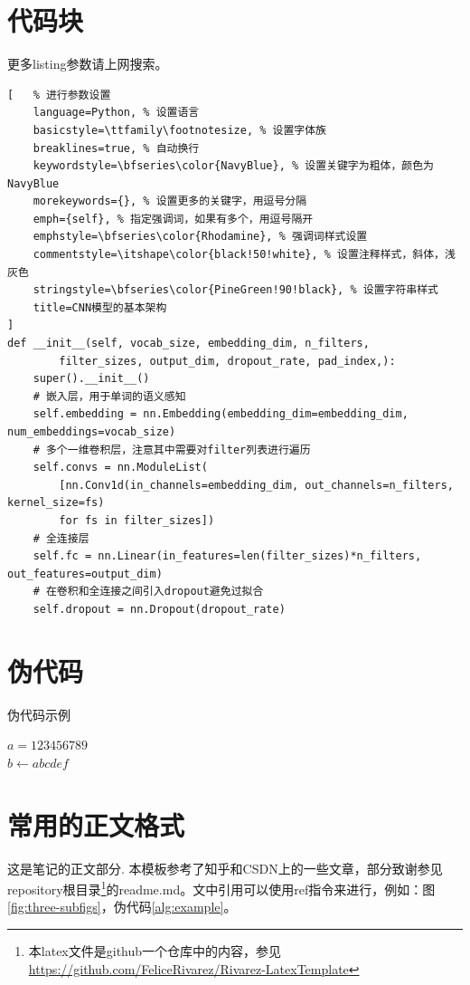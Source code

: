 \documentclass[UTF8,a4paper,12pt]{ctexart}
\begin{document}
\section{代码块}
更多listing参数请上网搜索。
\begin{lstlisting}[   % 进行参数设置
    language=Python, % 设置语言
    basicstyle=\ttfamily\footnotesize, % 设置字体族
    breaklines=true, % 自动换行
    keywordstyle=\bfseries\color{NavyBlue}, % 设置关键字为粗体，颜色为 NavyBlue
    morekeywords={}, % 设置更多的关键字，用逗号分隔
    emph={self}, % 指定强调词，如果有多个，用逗号隔开
    emphstyle=\bfseries\color{Rhodamine}, % 强调词样式设置
    commentstyle=\itshape\color{black!50!white}, % 设置注释样式，斜体，浅灰色
    stringstyle=\bfseries\color{PineGreen!90!black}, % 设置字符串样式
    title=CNN模型的基本架构
]  
def __init__(self, vocab_size, embedding_dim, n_filters,
        filter_sizes, output_dim, dropout_rate, pad_index,):
    super().__init__()
    # 嵌入层，用于单词的语义感知
    self.embedding = nn.Embedding(embedding_dim=embedding_dim, num_embeddings=vocab_size)
    # 多个一维卷积层，注意其中需要对filter列表进行遍历
    self.convs = nn.ModuleList(
        [nn.Conv1d(in_channels=embedding_dim, out_channels=n_filters, kernel_size=fs)
        for fs in filter_sizes])
    # 全连接层
    self.fc = nn.Linear(in_features=len(filter_sizes)*n_filters, out_features=output_dim)
    # 在卷积和全连接之间引入dropout避免过拟合
    self.dropout = nn.Dropout(dropout_rate)
\end{lstlisting} 


\section{伪代码}
\begin{algorithm}[htbp]
	\caption{伪代码示例}\label{alg:example}
    \SetAlgoLined %
	\BlankLine
    $a=123456789$\\
	$b \leftarrow abcdef$
\end{algorithm}


\section{常用的正文格式}
这是笔记的正文部分. 本模板参考了知乎\cite{自用模板}和CSDN上的一些文章，部分致谢参见repository根目录\footnote{本latex文件是github一个仓库中的内容，参见\url{https://github.com/FeliceRivarez/Rivarez-LatexTemplate}}的readme.md。文中引用可以使用ref指令来进行，例如：图\ref{fig:three-subfigs}，伪代码\ref{alg:example}。
\end{document}
